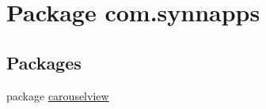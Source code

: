 \hypertarget{namespacecom_1_1synnapps}{}\section{Package com.\+synnapps}
\label{namespacecom_1_1synnapps}
\subsection*{Packages}
\begin{DoxyCompactItemize}
\item 
package \mbox{\hyperlink{namespacecom_1_1synnapps_1_1carouselview}{carouselview}}
\end{DoxyCompactItemize}
